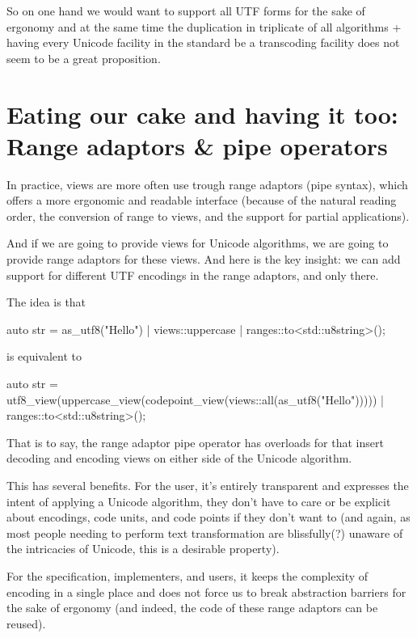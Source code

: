 \documentclass{wg21}
\begin{document}
So on one hand we would want to support all UTF forms for the sake of ergonomy and at the same time the duplication in triplicate of all algorithms
+ having every Unicode facility in the standard be a transcoding facility does not seem to be a great proposition.

\section{Eating our cake and having it too: Range adaptors \& pipe operators}

In practice, views are more often use trough range adaptors (pipe syntax), which offers a more ergonomic and readable interface
(because of the natural reading order, the conversion of range to views, and the support for partial applications).

And if we are going to provide views for Unicode algorithms, we are going to provide range adaptors for these views.
And here is the key insight: we can add support for different UTF encodings in the range adaptors, and only there.

The idea is that

\begin{colorblock}
auto str = as_utf8("Hello") | views::uppercase | ranges::to<std::u8string>();
\end{colorblock}

is equivalent to

\begin{colorblock}
auto str = utf8_view(uppercase_view(codepoint_view(views::all(as_utf8("Hello")))))
 | ranges::to<std::u8string>();
\end{colorblock}

That is to say, the range adaptor pipe operator has overloads for  that insert decoding and encoding views on either side of the Unicode algorithm.

This has several benefits.
For the user, it's entirely transparent and expresses the intent of applying a Unicode algorithm, they don't have to care or be explicit about encodings, code units, and
code points if they don't want to (and again, as most people needing to perform text transformation are blissfully(?) unaware of the intricacies of Unicode, this is a desirable property).

For the specification, implementers, and users, it keeps the complexity of encoding in a single place and does not force us to break abstraction barriers for the sake of ergonomy (and indeed, the code of these range adaptors can be reused).
\end{document}
